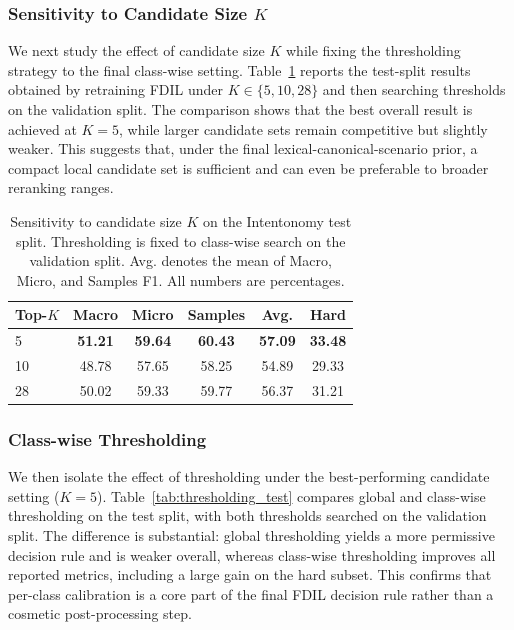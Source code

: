 \subsubsection{Sensitivity to Candidate Size $K$}

We next study the effect of candidate size $K$ while fixing the thresholding strategy to the final class-wise setting. Table~\ref{tab:k_sensitivity_test} reports the test-split results obtained by retraining FDIL under $K \in \{5,10,28\}$ and then searching thresholds on the validation split. The comparison shows that the best overall result is achieved at $K=5$, while larger candidate sets remain competitive but slightly weaker. This suggests that, under the final lexical-canonical-scenario prior, a compact local candidate set is sufficient and can even be preferable to broader reranking ranges.

\begin{table}[t]
\centering
\caption{Sensitivity to candidate size $K$ on the Intentonomy test split. Thresholding is fixed to class-wise search on the validation split. Avg. denotes the mean of Macro, Micro, and Samples F1. All numbers are percentages.}
\label{tab:k_sensitivity_test}
\begin{tabular}{lccccc}
\hline
Top-$K$ & Macro & Micro & Samples & Avg. & Hard \\
\hline
5 & \textbf{51.21} & \textbf{59.64} & \textbf{60.43} & \textbf{57.09} & \textbf{33.48} \\
10 & 48.78 & 57.65 & 58.25 & 54.89 & 29.33 \\
28 & 50.02 & 59.33 & 59.77 & 56.37 & 31.21 \\
\hline
\end{tabular}
\end{table}

\subsubsection{Class-wise Thresholding}

We then isolate the effect of thresholding under the best-performing candidate setting ($K=5$). Table~\ref{tab:thresholding_test} compares global and class-wise thresholding on the test split, with both thresholds searched on the validation split. The difference is substantial: global thresholding yields a more permissive decision rule and is weaker overall, whereas class-wise thresholding improves all reported metrics, including a large gain on the hard subset. This confirms that per-class calibration is a core part of the final FDIL decision rule rather than a cosmetic post-processing step.

